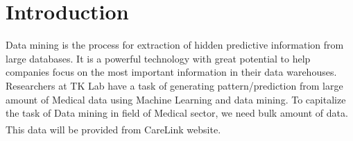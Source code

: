 \documentclass[article,type=msc,colorback,accentcolor=tud9c,twoside,11pt]{tudthesis}
\begin{document}
\clearpage
\tableofcontents 
\clearpage
\listoffigures
\clearpage
\listoftables
{}

\clearpage
{}
\section{Introduction}
Data mining is the process for extraction of hidden predictive information from large databases. It is a powerful technology with great potential to help companies focus on the most important information in their data warehouses. Researchers at TK Lab have a task of generating pattern/prediction from large amount of Medical data using Machine Learning and data mining. To capitalize the task of Data mining in field of Medical sector, we need bulk amount of data. This data will be provided from CareLink\textsuperscript{\textregistered} website. 
\end{document}
